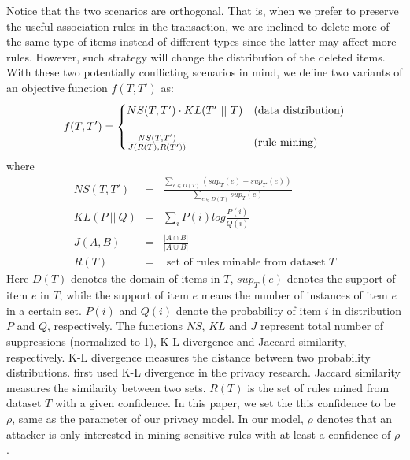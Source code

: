 Notice that the two scenarios are orthogonal. That is, 
when we prefer to preserve the useful association rules in the transaction,
we are inclined to delete more of the same type of items instead of 
different types since the latter may affect more rules. However, such strategy will
change the distribution of the deleted items. 
With these two potentially conflicting scenarios in mind, 
we define two variants of an objective function $f(T, T')$ as:
\begin{equation}
f(T, T') =
\begin{cases}
NS(T, T')\cdot KL(T'~||~T) & \rm{(data~ distribution)} \\
& \\
\frac{NS(T, T')}{J(R(T), R(T'))} & \rm{(rule~ mining)}
\end{cases}
\end{equation}
where
\begin{eqnarray}
NS(T,T') &=& \frac{\sum_{e\in D(T)}(sup_T(e) - sup_{T'}(e))}{\sum_{e\in D(T)}sup_{T}(e)} \\
KL(P~||~Q)&=&\sum_{i}P(i)log\frac{P(i)}{Q(i)} \label{eq:kl}\\
J(A, B) &=& \frac{|A \cap B|}{|A \cup B|}\\
R(T)&=& \text{ set of rules minable from dataset } T
\label{eq:kl-dis}
\end{eqnarray}
Here $D(T)$ denotes the domain of items in $T$, $sup_T(e)$ denotes the
support of item $e$ in $T$, while the support of item $e$ means the number of instances of item $e$ in a certain set.
$P(i)$ and $Q(i)$ denote the probability of item $i$ in distribution $P$ and $Q$, respectively.
The functions $NS$, $KL$ and $J$ represent
total number of suppressions (normalized to 1),
K-L divergence\cite{kl-divergence} and
Jaccard similarity\cite{jaccard-sim}, respectively. K-L
divergence measures the distance between two probability distributions.
\cite{Kifer:l-diversity} first used K-L divergence in the privacy research.
Jaccard similarity measures the similarity between two sets.
$R(T)$ is the set of rules mined from dataset $T$ with a given confidence. In this paper, we set the this confidence to be
$\rho$, same as the parameter of our privacy model.
In our model, $\rho$ denotes that an attacker is only
interested in mining sensitive rules with at least a
confidence of $\rho$.
%
